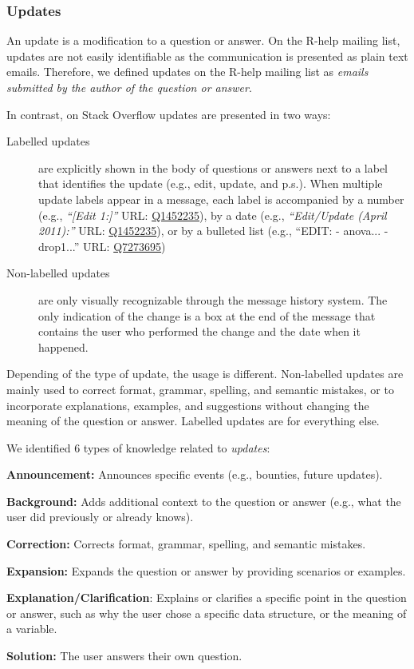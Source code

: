 \documentclass{sig-alternate-05-2015}
\begin{document}
\subsubsection{Updates}

	An update is a modification to a question or answer.
	On the R-help mailing list, updates are not easily identifiable as the communication is presented as plain text emails.
	Therefore, we defined updates on the R-help mailing list as \emph{emails submitted by the author of the question or answer}.

	In contrast, on Stack Overflow updates are presented in two ways:
	\begin{description}
		\item[Labelled updates] are explicitly shown in the body of questions or answers next to a label that identifies the update (e.g., edit, update, and p.s.).
		When multiple update labels appear in a message, each label is accompanied by a number (e.g., \textit{``[Edit 1:]''} {\footnotesize URL:  \href{http://goo.gl/ptYAG0}{Q1452235}}), by a date (e.g., \textit{``Edit/Update (April 2011):''} {\footnotesize URL:  \href{http://goo.gl/ptYAG0}{Q1452235}}), or by a bulleted list (e.g., ``EDIT: - anova... -drop1...'' {\footnotesize URL:  \href{http://goo.gl/sQiq0M}{Q7273695}})

		\item[Non-labelled updates] are only visually recognizable through the message history system. The only indication of the change is a box at the end of the message that contains the user who performed the change and the date when it happened.
	\end{description}

	Depending of the type of update, the usage is different.
	Non-labelled updates are mainly used to correct format, grammar, spelling, and semantic mistakes, or to incorporate explanations, examples, and suggestions without changing the meaning of the question or answer. Labelled updates are for everything else.

	We identified 6 types of knowledge related to \textit{updates}:
	\begin{packed_enum}
		\item \textbf{Announcement:} Announces specific events (e.g., bounties, future updates).
		\item \textbf{Background:} Adds additional context to the question or answer (e.g., what the user did previously or already knows).
		\item \textbf{Correction:} Corrects format, grammar, spelling, and semantic mistakes.
		\item \textbf{Expansion:} Expands the question or answer by providing scenarios or examples.
		\item \textbf{Explanation/Clarification}: Explains or clarifies a specific point in the question or answer, such as why the user chose a specific data structure, or the meaning of a variable.
		\item \textbf{Solution:} The user answers their own question.
	\end{packed_enum}
\end{document}
